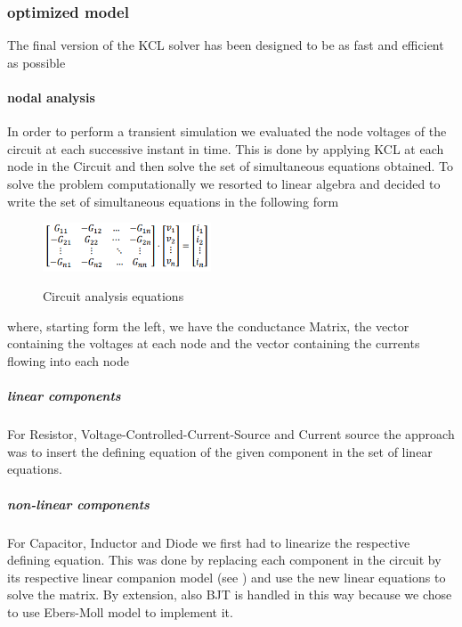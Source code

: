 \documentclass{article}
\begin{document}
\subsubsection{optimized model}
The final version of the KCL solver has been designed to be as fast and efficient as possible


















\paragraph{nodal analysis}
In order to perform a transient simulation we evaluated the node voltages of the circuit at each successive instant in time. This is done by applying KCL at each node in the Circuit and then solve the set of simultaneous equations obtained.\bigbreak
To solve the problem computationally we resorted to linear algebra and decided to write the set of simultaneous equations in the following form
\begin{figure}[h]
    \caption{Circuit analysis equations}
    \centering
    \includegraphics[width=5cm]{images/Conductance_Matrix.PNG}
    \label{fig:ConductanceMat}
\end{figure}

where, starting form the left, we have the conductance Matrix, the vector containing the voltages at each node and the vector containing the currents flowing into each node
\subparagraph{linear components}
For Resistor, Voltage-Controlled-Current-Source and Current source the approach was to insert the defining equation of the given component in the set of linear equations. 
\subparagraph{non-linear components}
For Capacitor, Inductor and Diode we first had to linearize the respective defining equation.
This was done by replacing each component in the circuit by its respective linear companion model (see \cite{LinearCompanionModels}) and use the new linear equations to solve the matrix. By extension, also BJT is handled in this way because we chose to use Ebers-Moll model to implement it.\bigbreak
\end{document}
